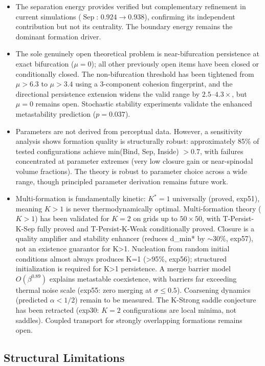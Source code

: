 \documentclass[lettersize,journal]{IEEEtran}
\DeclareMathOperator{\Sep}{Sep}
\begin{document}
\begin{itemize}
\item The separation energy provides verified but complementary refinement in current simulations ($\Sep$: $0.924 \to 0.938$), confirming its independent contribution but not its centrality. The boundary energy remains the dominant formation driver.
\item The sole genuinely open theoretical problem is near-bifurcation persistence at exact bifurcation ($\mu = 0$); all other previously open items have been closed or conditionally closed. The non-bifurcation threshold has been tightened from $\mu > 6.3$ to $\mu > 3.4$ using a 3-component cohesion fingerprint, and the directional persistence extension widens the valid range by $2.5$--$4.3\times$, but $\mu = 0$ remains open. Stochastic stability experiments validate the enhanced metastability prediction ($p = 0.037$).
\item Parameters are not derived from perceptual data. However, a sensitivity analysis shows formation quality is structurally robust: approximately 85\% of tested configurations achieve min(Bind, Sep, Inside) $> 0.7$, with failures concentrated at parameter extremes (very low closure gain or near-spinodal volume fractions). The theory is robust to parameter choice across a wide range, though principled parameter derivation remains future work.
\item Multi-formation is fundamentally kinetic: $K^* = 1$ universally (proved, exp51), meaning $K > 1$ is never thermodynamically optimal. Multi-formation theory ($K > 1$) has been validated for $K = 2$ on grids up to $50 \times 50$, with T-Persist-K-Sep fully proved and T-Persist-K-Weak conditionally proved. Closure is a quality amplifier and stability enhancer (reduces d_min* by $\sim 30\%$, exp57), not an existence guarantor for K>1. Nucleation from random initial conditions almost always produces K=1 (>95\%, exp56); structured initialization is required for K>1 persistence. A merge barrier model $O(\beta^{0.89})$ explains metastable coexistence, with barriers far exceeding thermal noise scale (exp55: zero merging at $\sigma\leq 0.5$). Coarsening dynamics (predicted $\alpha < 1/2$) remain to be measured. The K-Strong saddle conjecture has been retracted (exp30: $K = 2$ configurations are local minima, not saddles). Coupled transport for strongly overlapping formations remains open.
\end{itemize}

\subsection{Structural Limitations}
\end{document}
